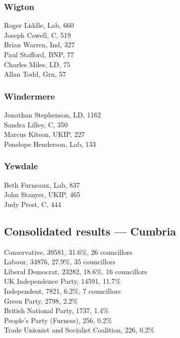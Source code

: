 \documentclass[a4paper,openany,10pt]{book}
\begin{document}
\subsubsection*{Wigton}



Roger Liddle, Lab, 660\\
Joseph Cowell, C, 519\\
Brian Warren, Ind, 327\\
Paul Stafford, BNP, 77\\
Charles Miles, LD, 75\\
Allan Todd, Grn, 57\\


\subsubsection*{Windermere}



Jonathan Stephenson, LD, 1162\\
Sandra Lilley, C, 350\\
Marcus Kitson, UKIP, 227\\
Penelope Henderson, Lab, 133\\


\subsubsection*{Yewdale}



Beth Furneaux, Lab, 837\\
John Stanyer, UKIP, 465\\
Judy Prest, C, 444\\




\subsection*{Consolidated results --- Cumbria}
Conservative, 39581, 31.6\%, 26 councillors\\
Labour, 34876, 27.9\%, 35 councillors\\
Liberal Democrat, 23282, 18.6\%, 16 councillors\\
UK Independence Party, 14591, 11.7\% \\
Independent, 7821, 6.2\%, 7 councillors\\
Green Party, 2798, 2.2\% \\
British National Party, 1737, 1.4\% \\
People's Party (Furness), 256, 0.2\% \\
Trade Unionist and Socialist Coalition, 226, 0.2\% \\
\end{document}
